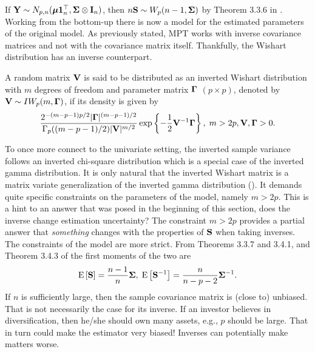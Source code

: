 \documentclass[12pt, twoside]{book}\usepackage{knitr}
\begin{document}
If $\mathbf{Y} \sim N_{p,n}(\mbox{\boldmath$\mu$} \mathbf{1}_n^\top, \mathbf{\Sigma} \otimes \mathbf{I}_n)$, then $n\mathbf{S} \sim W_p(n-1, \mathbf{\Sigma})$ by Theorem 3.3.6 in \citet{GuptaNagar2000}.
Working from the bottom-up there is now a model for the estimated parameters of the original model.
As previously stated, MPT works with inverse covariance matrices and not with the covariance matrix itself. 
Thankfully, the Wishart distribution has an inverse counterpart.
\begin{definition}\label{def:inverse_wishart}
	A random matrix $\mathbf{V}$ is said to be distributed as an inverted Wishart distribution with $m$ degrees of freedom and parameter matrix $\boldsymbol{\Gamma}$ $(p \times p)$, denoted by $\mathbf{V} \sim IW_p(m, \boldsymbol{\Gamma})$, if its density is given by
	\begin{equation}\label{eqn:inverse_wishart}
	\frac{2^{-(m-p-1)p/2} |\boldsymbol{\Gamma}|^{(m-p-1)/2} }{\Gamma_p ((m-p-1)/2) |\mathbf{V}|^{m/2}} \exp\left\{ -\frac{1}{2} \mathbf{V}^{-1} \boldsymbol{\Gamma} \right\}, \; m > 2p, \mathbf{V}, \boldsymbol{\Gamma} > 0.
	\end{equation}
\end{definition}
To once more connect to the univariate setting, the inverted sample variance follows an inverted chi-square distribution which is a special case of the inverted gamma distribution.
It is only natural that the inverted Wishart matrix is a matrix variate generalization of the inverted gamma distribution (\citet[page 111]{GuptaNagar2000}). 
It demands quite specific constraints on the parameters of the model, namely $m > 2p$.
This is a hint to an answer that was posed in the beginning of this section, does the inverse change estimation uncertainty? 
The constraint $m>2p$ provides a partial answer that \textit{something} changes with the properties of $\mathbf{S}$ when taking inverses.
The constraints of the model are more strict.
From Theorems 3.3.7 and 3.4.1, and Theorem 3.4.3 of \citet{GuptaNagar2000} the first moments of the two are
$$
\operatorname{E}\left[\mathbf{S}\right] = \frac{n-1}{n} \mathbf{\Sigma}, \; 
\operatorname{E}\left[\mathbf{S}^{-1}\right] = \frac{n}{n-p-2}\mathbf{\Sigma}^{-1}.
$$
If $n$ is sufficiently large, then the sample covariance matrix is (close to) unbiased.
That is not necessarily the case for its inverse.
If an investor believes in diversification, then he/she should own many assets, e.g., $p$ should be large.
That in turn could make the estimator very biased!
Inverses can potentially make matters worse.
\end{document}
